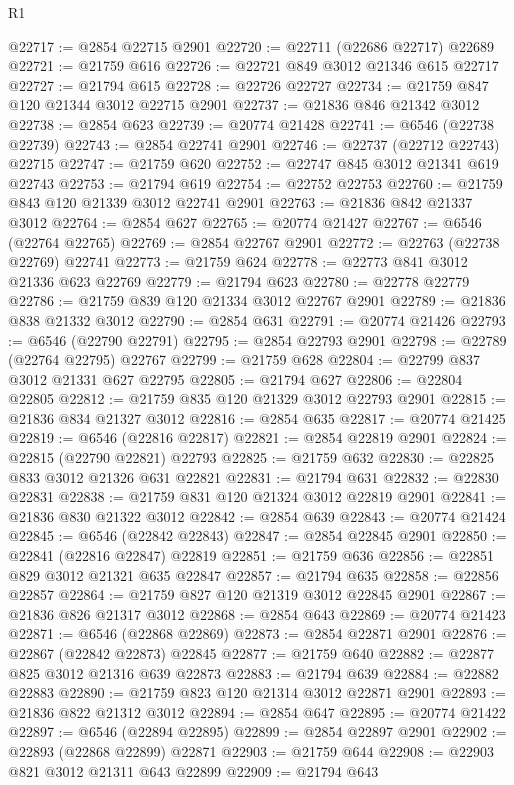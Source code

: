 \begin{lexlean}{R1}
\begin{coremodule}
@22717 := @2854 @22715 @2901
@22720 := @22711 (@22686 @22717) @22689
@22721 := @21759 @616
@22726 := @22721 @849 @3012 @21346 @615 @22717
@22727 := @21794 @615
@22728 := @22726 @22727
@22734 := @21759 @847 @120 @21344 @3012 @22715 @2901
@22737 := @21836 @846 @21342 @3012
@22738 := @2854 @623
@22739 := @20774 @21428
@22741 := @6546 (@22738 @22739)
@22743 := @2854 @22741 @2901
@22746 := @22737 (@22712 @22743) @22715
@22747 := @21759 @620
@22752 := @22747 @845 @3012 @21341 @619 @22743
@22753 := @21794 @619
@22754 := @22752 @22753
@22760 := @21759 @843 @120 @21339 @3012 @22741 @2901
@22763 := @21836 @842 @21337 @3012
@22764 := @2854 @627
@22765 := @20774 @21427
@22767 := @6546 (@22764 @22765)
@22769 := @2854 @22767 @2901
@22772 := @22763 (@22738 @22769) @22741
@22773 := @21759 @624
@22778 := @22773 @841 @3012 @21336 @623 @22769
@22779 := @21794 @623
@22780 := @22778 @22779
@22786 := @21759 @839 @120 @21334 @3012 @22767 @2901
@22789 := @21836 @838 @21332 @3012
@22790 := @2854 @631
@22791 := @20774 @21426
@22793 := @6546 (@22790 @22791)
@22795 := @2854 @22793 @2901
@22798 := @22789 (@22764 @22795) @22767
@22799 := @21759 @628
@22804 := @22799 @837 @3012 @21331 @627 @22795
@22805 := @21794 @627
@22806 := @22804 @22805
@22812 := @21759 @835 @120 @21329 @3012 @22793 @2901
@22815 := @21836 @834 @21327 @3012
@22816 := @2854 @635
@22817 := @20774 @21425
@22819 := @6546 (@22816 @22817)
@22821 := @2854 @22819 @2901
@22824 := @22815 (@22790 @22821) @22793
@22825 := @21759 @632
@22830 := @22825 @833 @3012 @21326 @631 @22821
@22831 := @21794 @631
@22832 := @22830 @22831
@22838 := @21759 @831 @120 @21324 @3012 @22819 @2901
@22841 := @21836 @830 @21322 @3012
@22842 := @2854 @639
@22843 := @20774 @21424
@22845 := @6546 (@22842 @22843)
@22847 := @2854 @22845 @2901
@22850 := @22841 (@22816 @22847) @22819
@22851 := @21759 @636
@22856 := @22851 @829 @3012 @21321 @635 @22847
@22857 := @21794 @635
@22858 := @22856 @22857
@22864 := @21759 @827 @120 @21319 @3012 @22845 @2901
@22867 := @21836 @826 @21317 @3012
@22868 := @2854 @643
@22869 := @20774 @21423
@22871 := @6546 (@22868 @22869)
@22873 := @2854 @22871 @2901
@22876 := @22867 (@22842 @22873) @22845
@22877 := @21759 @640
@22882 := @22877 @825 @3012 @21316 @639 @22873
@22883 := @21794 @639
@22884 := @22882 @22883
@22890 := @21759 @823 @120 @21314 @3012 @22871 @2901
@22893 := @21836 @822 @21312 @3012
@22894 := @2854 @647
@22895 := @20774 @21422
@22897 := @6546 (@22894 @22895)
@22899 := @2854 @22897 @2901
@22902 := @22893 (@22868 @22899) @22871
@22903 := @21759 @644
@22908 := @22903 @821 @3012 @21311 @643 @22899
@22909 := @21794 @643

\end{coremodule}
\end{lexlean}
